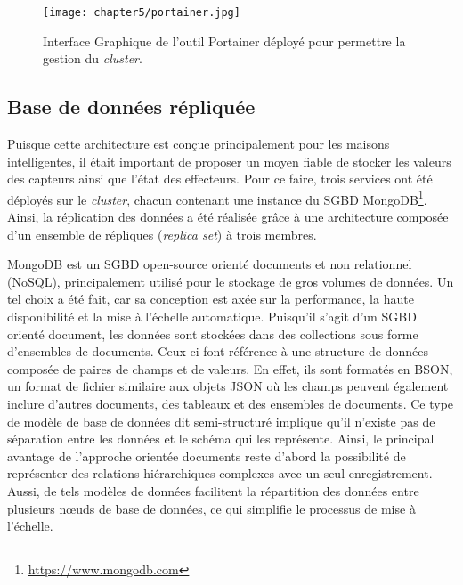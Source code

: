 \begin{figure}[H]
	\centering
	\texttt{[image: chapter5/portainer.jpg]}
        \caption{Interface Graphique de l'outil Portainer déployé pour permettre la gestion du \textit{cluster}.}
	\label{fig:portainer}
\end{figure}

\subsection{Base de données répliquée}

Puisque cette architecture est conçue principalement pour les maisons intelligentes, il était important de proposer un moyen fiable de stocker les valeurs des capteurs ainsi que l'état des effecteurs. Pour ce faire, trois services ont été déployés sur le \textit{cluster}, chacun contenant une instance du \ac{SGBD} MongoDB\footnote{\url{https://www.mongodb.com}}. Ainsi, la réplication des données a été réalisée grâce à une architecture composée d'un ensemble de répliques (\textit{replica set}) à trois membres.

MongoDB est un \acs{SGBD} open-source orienté documents et non relationnel (\acs{NoSQL}), principalement utilisé pour le stockage de gros volumes de données. Un tel choix a été fait, car sa conception est axée sur la performance, la haute disponibilité et la mise à l'échelle automatique. Puisqu'il s'agit d'un \acs{SGBD} orienté document, les données sont stockées dans des collections sous forme d'ensembles de documents. Ceux-ci font référence à une structure de données composée de paires de champs et de valeurs. En effet, ils sont formatés en \ac{BSON}, un format de fichier similaire aux objets \acs{JSON} où les champs peuvent également inclure d'autres documents, des tableaux et des ensembles de documents. Ce type de modèle de base de données dit semi-structuré implique qu'il n'existe pas de séparation entre les données et le schéma qui les représente. Ainsi, le principal avantage de l'approche orientée documents reste d'abord la possibilité de représenter des relations hiérarchiques complexes avec un seul enregistrement. Aussi, de tels modèles de données facilitent la répartition des données entre plusieurs n\oe{}uds de base de données, ce qui simplifie le processus de mise à l'échelle.

